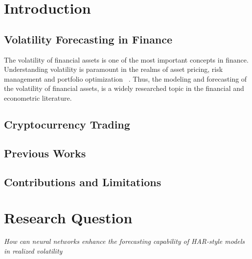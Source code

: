 \chapter{Introduction}
\label{sec:org06668a7}

\section{Volatility Forecasting in Finance}
\label{sec:org6ff1fb7}
The volatility of financial assets is one of the most important concepts in finance.
Understanding volatility is paramount in the realms of asset pricing, risk management and portfolio optimization ~\cite[p. 44-47]{eltonModernPortfolioTheory2014}.
Thus, the modeling and forecasting of the volatility of financial assets, is a widely researched topic in the financial and econometric literature.


\section{Cryptocurrency Trading}
\label{sec:orgb98bd0e}

\section{Previous Works}
\label{sec:orgb34bd0e}

\section{Contributions and Limitations}
\label{sec:orgb3abd0e}

\chapter{Research Question}
\label{sec:org6232157}
\emph{How can neural networks enhance the forecasting capability of HAR-style models in realized volatility}
